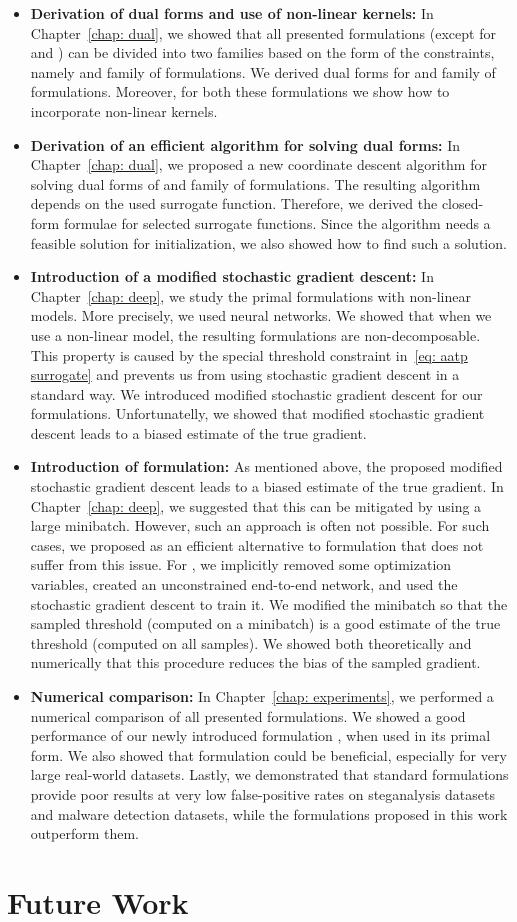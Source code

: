 \begin{itemize}
  \item \textbf{Derivation of dual forms and use of non-linear kernels:} In Chapter~\ref{chap: dual}, we showed that all presented formulations (except for \Grill and \GrillNP) can be divided into two families based on the form of the constraints, namely \TopPushK and \PatMat family of formulations. We derived dual forms for \TopPushK and \PatMat family of formulations. Moreover, for both these formulations we show how to incorporate non-linear kernels.
  \item \textbf{Derivation of an efficient algorithm for solving dual forms:} In Chapter~\ref{chap: dual}, we proposed a new coordinate descent algorithm for solving dual forms of \TopPushK and \PatMat family of formulations. The resulting algorithm depends on the used surrogate function. Therefore, we derived the closed-form formulae for selected surrogate functions. Since the algorithm needs a feasible solution for initialization, we also showed how to find such a solution.
  \item \textbf{Introduction of a modified stochastic gradient descent:} In Chapter~\ref{chap: deep}, we study the primal formulations with non-linear models. More precisely, we used neural networks. We showed that when we use a non-linear model, the resulting formulations are non-decomposable. This property is caused by the special threshold constraint in~\eqref{eq: aatp surrogate} and prevents us from using stochastic gradient descent in a standard way. We introduced modified stochastic gradient descent for our formulations. Unfortunatelly, we showed that modified stochastic gradient descent leads to a biased estimate of the true gradient.
  \item \textbf{Introduction of \DeepTopPush formulation:} As mentioned above, the proposed modified stochastic gradient descent leads to a biased estimate of the true gradient. In Chapter~\ref{chap: deep}, we suggested that this can be mitigated by using a large minibatch. However, such an approach is often not possible. For such cases, we proposed \DeepTopPush as an efficient alternative to \TopPush formulation that does not suffer from this issue. For \DeepTopPush, we implicitly removed some optimization variables, created an unconstrained end-to-end network, and used the stochastic gradient descent to train it. We modified the minibatch so that the sampled threshold (computed on a minibatch) is a good estimate of the true threshold (computed on all samples). We showed both theoretically and numerically that this procedure reduces the bias of the sampled gradient.
  \item \textbf{Numerical comparison:} In Chapter~\ref{chap: experiments}, we performed a numerical comparison of all presented formulations. We showed a good performance of our newly introduced formulation \PatMatNP, when used in its primal form. We also showed that \DeepTopPush formulation could be beneficial, especially for very large real-world datasets. Lastly, we demonstrated that standard formulations provide poor results at very low false-positive rates on steganalysis datasets and malware detection datasets, while the formulations proposed in this work outperform them.
\end{itemize}

\section*{Future Work}
